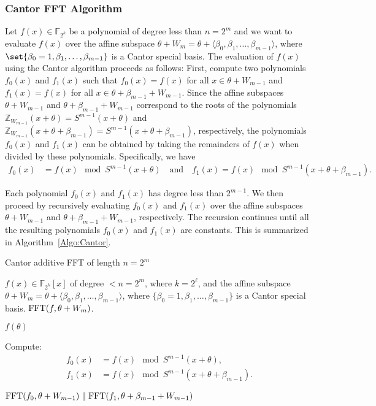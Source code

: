 \subsubsection{Cantor FFT Algorithm}
Let $f(x) \in \mathbb{F}_{2^k}$ be a polynomial of degree less than $n=2^m$ and we want to evaluate $f(x)$ over the affine subspace $\theta+W_m=\theta+\langle \beta_0,\beta_1,\ldots,\beta_{m-1} \rangle$, where $\set{\beta_0=1,\beta_1,\ldots,\beta_{m-1}}$ is a Cantor special basis. The evaluation of $f(x)$ using the Cantor algorithm proceeds as follows: First, compute two polynomials $f_0(x)$ and $f_1(x)$ such that $f_0(x)=f(x)$ for all $x\in \theta+W_{m-1}$ and $f_1(x)=f(x)$ for all $x\in \theta+\beta_{m-1}+W_{m-1}$. Since the affine subspaces $\theta + W_{m-1}$ and $\theta + \beta_{m-1} + W_{m-1}$ correspond to the roots of the polynomials 
$\mathbb{Z}_{W_{m-1}}(x + \theta) = S^{m-1}(x + \theta)$ and $\mathbb{Z}_{W_{m-1}}(x + \theta + \beta_{m-1}) = S^{m-1}(x + \theta + \beta_{m-1})$, 
respectively, the polynomials $f_0(x)$ and $f_1(x)$ can be obtained by taking the remainders of $f(x)$ when divided by these polynomials. Specifically, we have
\begin{equation*}
	\begin{aligned}
		f_0(x) &= f(x) \mod S^{m-1}(x + \theta)\quad \text{and} \quad f_1(x) = f(x) \mod S^{m-1}(x + \theta + \beta_{m-1}).
	\end{aligned}
\end{equation*}

Each polynomial $f_0(x)$ and $f_1(x)$ has degree less than $2^{m-1}$. We then proceed by recursively evaluating $f_0(x)$ and $f_1(x)$ over the affine subspaces $\theta + W_{m-1}$ and $\theta + \beta_{m-1} + W_{m-1}$, respectively. The recursion continues until all the resulting polynomials $f_0(x)$ and $f_1(x)$ are constants. This is summarized in Algorithm~\ref{Algo:Cantor}.


\begin{algorithm}[h]
	\caption{Cantor additive FFT of length $n = 2^m$}
	\label{Algo:Cantor}
	\begin{algorithmic}[1]
		\Require $f(x) \in \mathbb{F}_{2^k}[x]$ of degree $< n = 2^m$, where $k=2^{\ell}$, and the affine subspace $\theta+W_m=\theta+ \langle \beta_0,\beta_1,\ldots,\beta_{m-1} \rangle$, where $\{\beta_0=1,\beta_1,\ldots,\beta_{m-1}\}$ is a Cantor special basis.
		\Ensure $\operatorname{FFT}(f, \theta+W_m)$.
		
		\State \Return $f(\theta)$
		\EndIf
		
		\State Compute:
		\[
		\begin{aligned}
			f_0(x) &= f(x) \mod S^{m-1}(x + \theta), \\
			f_1(x) &= f(x) \mod S^{m-1}(x + \theta + \beta_{m-1}).
		\end{aligned}
		\]
		
		\State \Return $\operatorname{FFT}(f_0,\theta+W_{m-1}) \parallel \operatorname{FFT}(f_1, \theta+\beta_{m-1}+ W_{m-1})$
	\end{algorithmic}
\end{algorithm}




